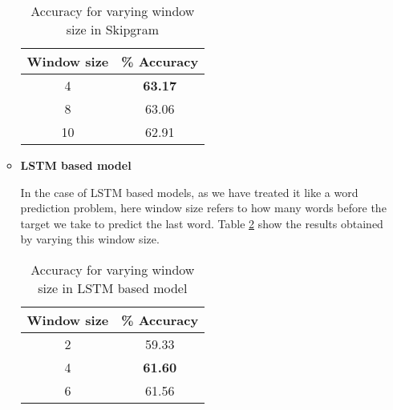 \documentclass{article}
\begin{document}
\begin{enumerate}
\begin{itemize}
                \begin{table}[h!]
                \begin{center}
                \begin{tabular}{ |c|c|} 
                 \hline
                Window size  & \% Accuracy \\ 
                 \hline \hline
                4 &   \textbf{63.17}\\
                 \hline
                8 &   63.06\\ 
                \hline
                10  & 62.91\\
                \hline
                \hline
                \end{tabular}
                \caption{Accuracy for varying window size in Skipgram }
                \label{tab:skipgram_ws}
                \end{center}
                \end{table}            
            \item \textbf{LSTM based model} 
            
            In the case of LSTM based models, as we have treated it like a word prediction problem, here window size refers to how many words before the target we take to predict the last word. Table \ref{tab:_wslstm} show the results obtained by varying this window size.

                \begin{table}[h!]
                \begin{center}
                \begin{tabular}{ |c|c|} 
                 \hline
                Window size  & \% Accuracy \\ 
                 \hline \hline
                2 &   59.33\\
                 \hline
                4 &   \textbf{61.60}\\ 
                \hline
                6  & 61.56\\
                \hline
                \hline
                \end{tabular}
                \caption{Accuracy for varying window size in LSTM based model }
                \label{tab:_wslstm}
                \end{center}
                \end{table}   
            
        \end{itemize}
\end{enumerate}
\end{document}

